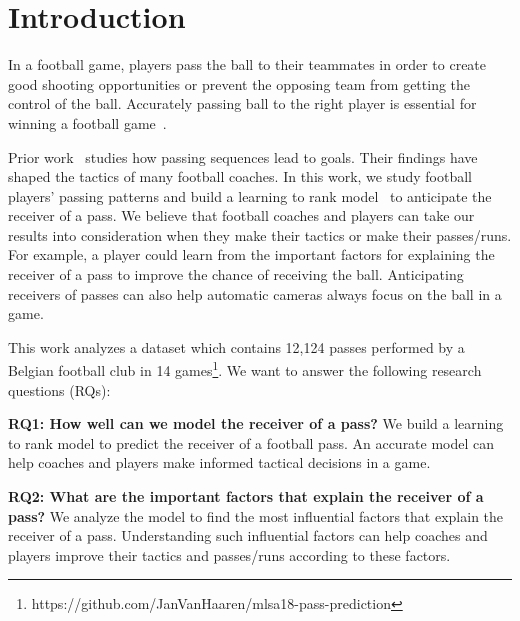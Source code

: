 \section{Introduction} \label{intro}
In a football game, players pass the ball to their teammates in order to create good shooting opportunities or prevent the opposing team from getting the control of the ball.
Accurately passing ball to the right player is essential for winning a football game~\cite{Ali2011Measuring,Hughes2005Analysis}.

Prior work~\cite{reep1968skill,Hughes2005Analysis} studies how passing sequences lead to goals. Their findings have shaped the tactics of many football coaches.
In this work, we study football players' passing patterns and build a learning to rank model~\cite{liu2009learning} to anticipate the receiver of a pass.
We believe that football coaches and players can take our results into consideration when they make their tactics or make their passes/runs. 
For example, a player could learn from the important factors for explaining the receiver of a pass to improve the chance of receiving the ball. 
Anticipating receivers of passes can also help automatic cameras always focus on the ball in a game.

This work analyzes a dataset which contains 12,124 passes performed by a Belgian football club in 14 games\footnote{\label{origin_dataset}https://github.com/JanVanHaaren/mlsa18-pass-prediction}. We want to answer the following research questions (RQs): 

\begin{description}
	
	\item \textbf{RQ1: How well can we model the receiver of a pass?}
	We build a learning to rank model to predict the receiver of a football pass. 
	An accurate model can help coaches and players make informed tactical decisions in a game.
	
	\item \textbf{RQ2: What are the important factors that explain the receiver of a pass?}
	We analyze the model to find the most influential factors that explain the receiver of a pass. Understanding such influential factors can help coaches and players improve their tactics and passes/runs according to these factors.
\end{description}

